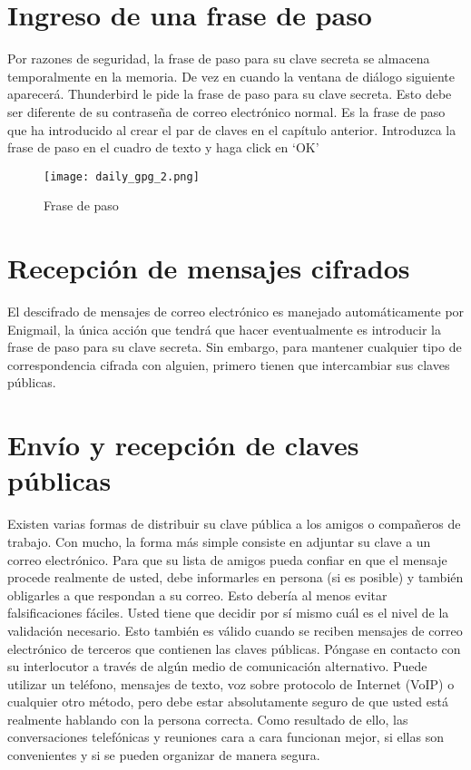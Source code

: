 \documentclass[10pt,a5paper,twoside,,]{book}
\begin{document}
\section{Ingreso de una frase de
paso}\label{ingreso-de-una-frase-de-paso}

Por razones de seguridad, la frase de paso para su clave secreta se
almacena temporalmente en la memoria. De vez en cuando la ventana de
diálogo siguiente aparecerá. Thunderbird le pide la frase de paso para
su clave secreta. Esto debe ser diferente de su contraseña de correo
electrónico normal. Es la frase de paso que ha introducido al crear el
par de claves en el capítulo anterior. Introduzca la frase de paso en el
cuadro de texto y haga click en `OK'

\begin{figure}[htbp]
\centering
\texttt{[image: daily\_gpg\_2.png]}
\caption{Frase de paso}
\end{figure}

\section{Recepción de mensajes
cifrados}\label{recepciuxf3n-de-mensajes-cifrados}

El descifrado de mensajes de correo electrónico es manejado
automáticamente por Enigmail, la única acción que tendrá que hacer
eventualmente es introducir la frase de paso para su clave secreta. Sin
embargo, para mantener cualquier tipo de correspondencia cifrada con
alguien, primero tienen que intercambiar sus claves públicas.

\section{Envío y recepción de claves
públicas}\label{envuxedo-y-recepciuxf3n-de-claves-puxfablicas}

Existen varias formas de distribuir su clave pública a los amigos o
compañeros de trabajo. Con mucho, la forma más simple consiste en
adjuntar su clave a un correo electrónico. Para que su lista de amigos
pueda confiar en que el mensaje procede realmente de usted, debe
informarles en persona (si es posible) y también obligarles a que
respondan a su correo. Esto debería al menos evitar falsificaciones
fáciles. Usted tiene que decidir por sí mismo cuál es el nivel de la
validación necesario. Esto también es válido cuando se reciben mensajes
de correo electrónico de terceros que contienen las claves públicas.
Póngase en contacto con su interlocutor a través de algún medio de
comunicación alternativo. Puede utilizar un teléfono, mensajes de texto,
voz sobre protocolo de Internet (VoIP) o cualquier otro método, pero
debe estar absolutamente seguro de que usted está realmente hablando con
la persona correcta. Como resultado de ello, las conversaciones
telefónicas y reuniones cara a cara funcionan mejor, si ellas son
convenientes y si se pueden organizar de manera segura.
\end{document}
